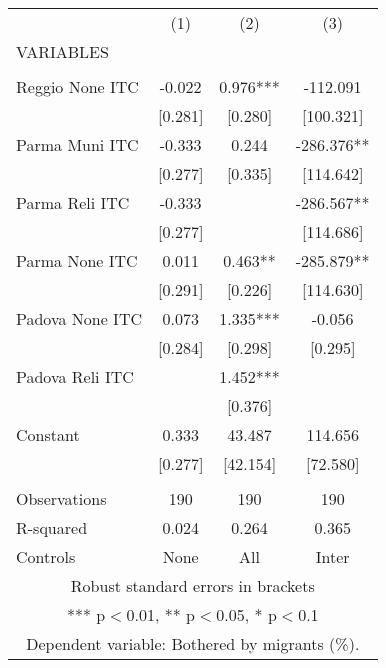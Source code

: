 \begin{tabular}{lccc} \hline
 & (1) & (2) & (3) \\
VARIABLES &  &  &  \\ \hline
 &  &  &  \\
Reggio None ITC & -0.022 & 0.976*** & -112.091 \\
 & [0.281] & [0.280] & [100.321] \\
Parma Muni ITC & -0.333 & 0.244 & -286.376** \\
 & [0.277] & [0.335] & [114.642] \\
Parma Reli ITC & -0.333 &  & -286.567** \\
 & [0.277] &  & [114.686] \\
Parma None ITC & 0.011 & 0.463** & -285.879** \\
 & [0.291] & [0.226] & [114.630] \\
Padova None ITC & 0.073 & 1.335*** & -0.056 \\
 & [0.284] & [0.298] & [0.295] \\
Padova Reli ITC &  & 1.452*** &  \\
 &  & [0.376] &  \\
Constant & 0.333 & 43.487 & 114.656 \\
 & [0.277] & [42.154] & [72.580] \\
 &  &  &  \\
Observations & 190 & 190 & 190 \\
R-squared & 0.024 & 0.264 & 0.365 \\
 Controls & None & All & Inter \\ \hline
\multicolumn{4}{c}{ Robust standard errors in brackets} \\
\multicolumn{4}{c}{ *** p$<$0.01, ** p$<$0.05, * p$<$0.1} \\
\multicolumn{4}{c}{ Dependent variable: Bothered by migrants (\%).} \\
\end{tabular}
